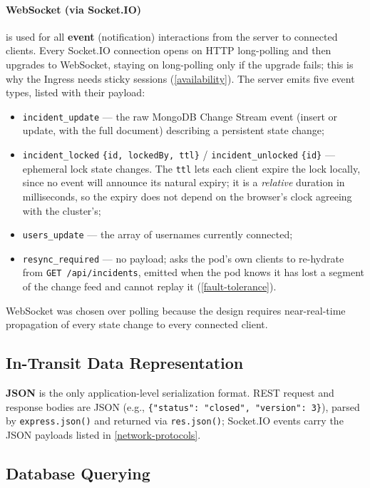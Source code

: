 \documentclass{scrartcl}
\begin{document}
\paragraph{WebSocket (via Socket.IO)} is used for all \textbf{event} (notification) interactions from the server to connected clients. Every Socket.IO connection opens on HTTP long-polling and then upgrades to WebSocket, staying on long-polling only if the upgrade fails; this is why the Ingress needs sticky sessions (\cref{availability}). The server emits five event types, listed with their payload:
%
\begin{itemize}
  \item \texttt{incident\_update} --- the raw MongoDB Change Stream event (insert or update, with the full document) describing a persistent state change;
  \item \texttt{incident\_locked} \texttt{\{id, lockedBy, ttl\}} / \texttt{incident\_unlocked} \texttt{\{id\}} --- ephemeral lock state changes. The \texttt{ttl} lets each client expire the lock locally, since no event will announce its natural expiry; it is a \emph{relative} duration in milliseconds, so the expiry does not depend on the browser's clock agreeing with the cluster's;
  \item \texttt{users\_update} --- the array of usernames currently connected;
  \item \texttt{resync\_required} --- no payload; asks the pod's own clients to re-hydrate from \texttt{GET /api/incidents}, emitted when the pod knows it has lost a segment of the change feed and cannot replay it (\cref{fault-tolerance}).
\end{itemize}
%
WebSocket was chosen over polling because the design requires near-real-time propagation of every state change to every connected client.

\subsection{In-Transit Data Representation}\label{data-representation}

\textbf{JSON} is the only application-level serialization format. REST request and response bodies are JSON (e.g., \texttt{\{"status": "closed", "version": 3\}}), parsed by \texttt{express.json()} and returned via \texttt{res.json()}; Socket.IO events carry the JSON payloads listed in \cref{network-protocols}.

\subsection{Database Querying}\label{database-querying}
\end{document}
